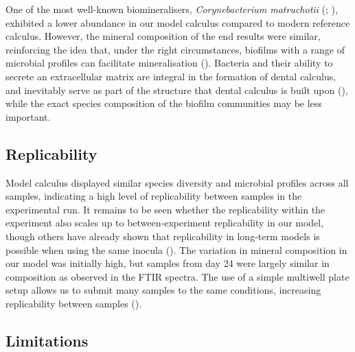 \documentclass[
  b5paper,
]{book}
\begin{document}
One of the most well-known biomineralisers, \emph{Corynebacterium
matruchotii}
(; ), exhibited a lower abundance in our model calculus compared to
modern reference calculus. However, the mineral composition of the end
results were similar, reinforcing the idea that, under the right
circumstances, biofilms with a range of microbial profiles can
facilitate mineralisation
().
Bacteria and their ability to secrete an extracellular matrix are
integral in the formation of dental calculus, and inevitably serve as
part of the structure that dental calculus is built upon
(), while the exact species composition of the biofilm
communities may be less important.

\subsection{Replicability}\label{replicability}

Model calculus displayed similar species diversity and microbial
profiles across all samples, indicating a high level of replicability
between samples in the experimental run. It remains to be seen whether
the replicability within the experiment also scales up to
between-experiment replicability in our model, though others have
already shown that replicability in long-term models is possible when
using the same inocula
(). The variation in mineral composition in our model was initially
high, but samples from day 24 were largely similar in composition as
observed in the FTIR spectra. The use of a simple multiwell plate setup
allows us to submit many samples to the same conditions, increasing
replicability between samples ().

\subsection{Limitations}\label{limitations}
\end{document}
